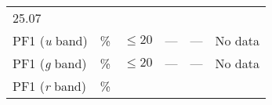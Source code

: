 \documentclass[DM,toc]{lsstdoc}
\begin{document}
\begin{longtable}[]{@{}llllll@{}}
\begin{minipage}[t]{0.12\columnwidth}
25.07\strut
\end{minipage} & \begin{minipage}[t]{0.17\columnwidth}\raggedright\strut
\strut
\end{minipage}\tabularnewline
\begin{minipage}[t]{0.14\columnwidth}\raggedright\strut
PF1 (\emph{u} band)\strut
\end{minipage} & \begin{minipage}[t]{0.06\columnwidth}\raggedright\strut
\%\strut
\end{minipage} & \begin{minipage}[t]{0.17\columnwidth}\raggedright\strut
\(\leq 20\)\strut
\end{minipage} & \begin{minipage}[t]{0.17\columnwidth}\raggedright\strut
---\strut
\end{minipage} & \begin{minipage}[t]{0.12\columnwidth}\raggedright\strut
---\strut
\end{minipage} & \begin{minipage}[t]{0.17\columnwidth}\raggedright\strut
No data\strut
\end{minipage}\tabularnewline
\begin{minipage}[t]{0.14\columnwidth}\raggedright\strut
PF1 (\emph{g} band)\strut
\end{minipage} & \begin{minipage}[t]{0.06\columnwidth}\raggedright\strut
\%\strut
\end{minipage} & \begin{minipage}[t]{0.17\columnwidth}\raggedright\strut
\(\leq 20\)\strut
\end{minipage} & \begin{minipage}[t]{0.17\columnwidth}\raggedright\strut
---\strut
\end{minipage} & \begin{minipage}[t]{0.12\columnwidth}\raggedright\strut
---\strut
\end{minipage} & \begin{minipage}[t]{0.17\columnwidth}\raggedright\strut
No data\strut
\end{minipage}\tabularnewline
\begin{minipage}[t]{0.14\columnwidth}\raggedright\strut
PF1 (\emph{r} band)\strut
\end{minipage} & \begin{minipage}[t]{0.06\columnwidth}\raggedright\strut
\%\strut
\end{minipage} & \begin{minipage}[t]{0.17\columnwidth}\raggedright\strut

\end{minipage}
\end{longtable}
\end{document}

